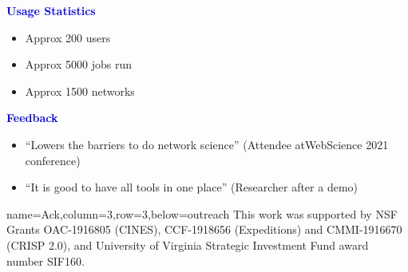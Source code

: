 \documentclass[landscape,paperwidth=70in,paperheight=46in,fontscale=0.225]{baposter} %
\begin{document}
\begin{poster}
{%
\begin{minipage}[t]{0.48 \textwidth}
\textcolor{blue}{\textbf{Usage Statistics}}
\medskip
\begin{itemize}[leftmargin=*,noitemsep,topsep=0pt]
    \item Approx 200 users  \smallskip
    \item Approx 5000 jobs run \smallskip
    \item Approx 1500 networks  
\end{itemize}
\end{minipage}
\quad
\begin{minipage}[t]{0.48 \textwidth}
\textcolor{blue}{\textbf{Feedback}}\
  \medskip
\begin{itemize}[leftmargin=*,noitemsep,topsep=0pt]
    \item ``Lowers the barriers to do network science'' 
     (Attendee at\newline WebScience 2021 conference)    \smallskip
    \item ``It is good to have all tools in one place'' (Researcher after a demo)
\end{itemize}
\end{minipage}
}


          {name=Ack,column=3,row=3,below=outreach}{
          \vspace*{0.045in}
{
\footnotesize
This work was supported by
NSF Grants OAC-1916805 (CINES),\newline
CCF-1918656 (Expeditions) and CMMI-1916670 (CRISP 2.0),
and\newline 
University of Virginia Strategic Investment Fund award
number SIF160.
}
          \vspace*{0.045in}
}

\end{poster}
\end{document}
